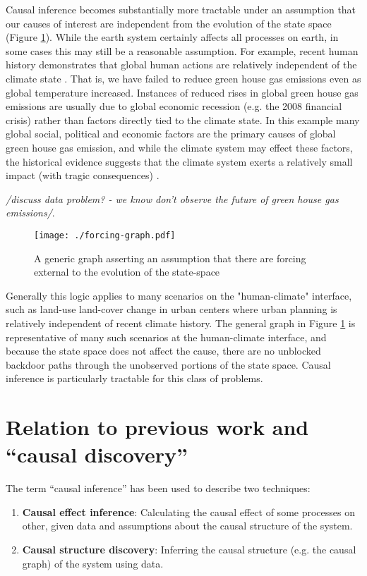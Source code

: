 \documentclass[12pt]{article}
\begin{document}
Causal inference becomes substantially more tractable under an
assumption that our causes of interest are independent from the
evolution of the state space (Figure \ref{fig:forcing}). While the
earth system certainly affects all processes on earth, in some cases
this may still be a reasonable assumption. For example, recent human
history demonstrates that global human actions are relatively
independent of the climate state \citep{arto2014drivers}. That is, we
have failed to reduce green house gas emissions even as global
temperature increased. Instances of reduced rises in global green
house gas emissions are usually due to global economic recession
(e.g. the 2008 financial crisis) rather than factors directly tied to
the climate state. In this example many global social, political and
economic factors are the primary causes of global green house gas
emission, and while the climate system may effect these factors, the
historical evidence suggests that the climate system exerts a
relatively small impact (with tragic consequences)
\citep{arto2014drivers}.

\emph{/discuss data problem? - we know
  don't observe the future of green house gas emissions/}.

\begin{figure}
  \texttt{[image: ./forcing-graph.pdf]}
  \caption{A generic graph asserting an assumption that there are
    forcing external to the evolution of the state-space}
  \label{fig:forcing}
\end{figure}

Generally this logic applies to many scenarios on the "human-climate"
interface, such as land-use land-cover change in urban centers where
urban planning is relatively independent of recent climate
history. The general graph in Figure \ref{fig:forcing} is
representative of many such scenarios at the human-climate interface,
and because the state space does not affect the cause, there are no
unblocked backdoor paths through the unobserved portions of the state
space. Causal inference is particularly tractable for this class of
problems.

\section{Relation to previous work and ``causal discovery''}
\label{sec:discovery}
The term ``causal inference'' has been used to describe two
techniques:

\begin{enumerate}
\item \textbf{Causal effect inference}: Calculating the causal effect
  of some processes on other, given data and assumptions about the
  causal structure of the system.
\item \textbf{Causal structure discovery}: Inferring the causal
  structure (e.g. the causal graph) of the system using data.
\end{enumerate}
\end{document}
